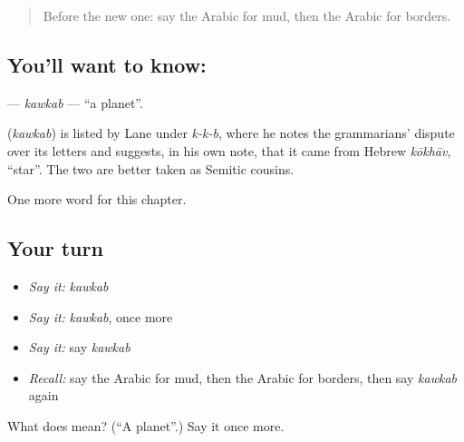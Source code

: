 \begin{quote}
Before the new one: say the Arabic for mud, then the Arabic for borders.
\end{quote}

\subsection*{You'll want to know: }
\textbf{} — \emph{kawkab} — \textquotedblleft{}a planet\textquotedblright{}.

\begin{cousinweb}
\textbf{} (\emph{kawkab}) is listed by Lane under \emph{k-k-b}, where he notes the grammarians' dispute over its letters and suggests, in his own note, that it came from Hebrew \emph{kōkhāv}, \textquotedblleft{}star\textquotedblright{}. The two are better taken as Semitic cousins.
\end{cousinweb}

\begin{grammarlens}[title={What you've built}]
One more word for this chapter.
\end{grammarlens}

\subsection*{Your turn}
\begin{itemize}
\raggedright
  \item \emph{Say it:} \emph{kawkab}
  \item \emph{Say it:} \emph{kawkab}, once more
  \item \emph{Say it:} say \emph{kawkab}
  \item \emph{Recall:} say the Arabic for mud, then the Arabic for borders, then say \emph{kawkab} again
\end{itemize}

\begin{tcolorbox}[breakable,colback=teal!4,colframe=teal!35!black,title={Before you move on}]
What does  mean? (\textquotedblleft{}A planet\textquotedblright{}.) Say it once more.
\end{tcolorbox}

